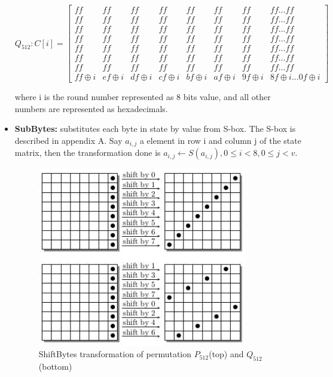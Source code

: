 \begin{itemize}
    $Q_{512}: C[i] = \begin{bmatrix}
      ff     & ff     & ff     & ff     & ff     & ff     & ff     & ff     \dots ff    \\
      ff     & ff     & ff     & ff     & ff     & ff     & ff     & ff     \dots ff    \\
      ff     & ff     & ff     & ff     & ff     & ff     & ff     & ff     \dots ff    \\
      ff     & ff     & ff     & ff     & ff     & ff     & ff     & ff     \dots ff    \\
      ff     & ff     & ff     & ff     & ff     & ff     & ff     & ff     \dots ff    \\
      ff     & ff     & ff     & ff     & ff     & ff     & ff     & ff     \dots ff    \\
      ff     & ff     & ff     & ff     & ff     & ff     & ff     & ff     \dots ff    \\
      ff \oplus i & ef \oplus i & df \oplus i & cf \oplus i & bf \oplus i & af \oplus i & 9f \oplus i & 8f \oplus i \dots 0f \oplus i
    \end{bmatrix}$

    where i is the round number represented as 8 bits value, and all other numbers are represented as
    hexadecimals.

  \item {\bf SubBytes:} substitutes each byte in state by value from S-box. The S-box is described in appendix
  A. Say $a_{i,j}$ a element in row i and column j of the state matrix, then the transformation done is 
  $a_{i,j} \gets S( a_{i,j}),  0 \leq i < 8, 0 \leq j < v.$ 
  
  \begin{figure}[h]
    \begin{center}
      \includegraphics[width=3.6in]{groestl512shift.jpg}
    \end{center}
    \caption{ShiftBytes transformation of permutation $P_{512}$(top) and $Q_{512}$(bottom)}
    \label{fig:lab}
  \end{figure}


\end{itemize}
